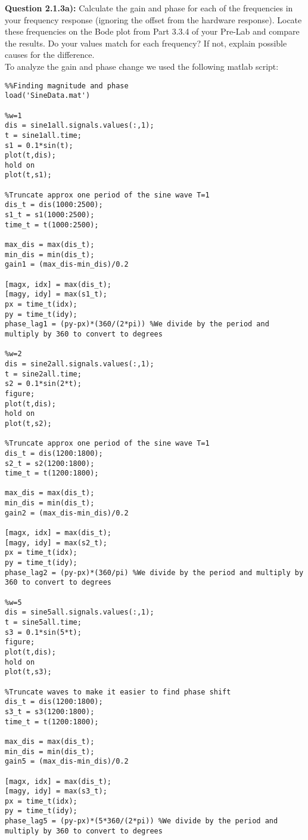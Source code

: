 \documentclass[11pt, twoside, letterpaper]{article}   	%
\begin{document}
\newpage
\textbf{Question 2.1.3a):} Calculate the gain and phase for each of the frequencies in your frequency response (ignoring the offset from the hardware response). Locate these frequencies on the Bode plot from Part 3.3.4 of your Pre-Lab and compare the results. Do your values match for each frequency? If not, explain possible causes for the difference.\\
To analyze the gain and phase change we used the following matlab script:
\begin{lstlisting}
%%Finding magnitude and phase
load('SineData.mat')

%w=1
dis = sine1all.signals.values(:,1);
t = sine1all.time;
s1 = 0.1*sin(t);
plot(t,dis);
hold on
plot(t,s1);

%Truncate approx one period of the sine wave T=1
dis_t = dis(1000:2500);
s1_t = s1(1000:2500);
time_t = t(1000:2500);

max_dis = max(dis_t);
min_dis = min(dis_t);
gain1 = (max_dis-min_dis)/0.2

[magx, idx] = max(dis_t);
[magy, idy] = max(s1_t);
px = time_t(idx);
py = time_t(idy);
phase_lag1 = (py-px)*(360/(2*pi)) %We divide by the period and multiply by 360 to convert to degrees

%w=2
dis = sine2all.signals.values(:,1);
t = sine2all.time;
s2 = 0.1*sin(2*t);
figure;
plot(t,dis);
hold on
plot(t,s2);

%Truncate approx one period of the sine wave T=1
dis_t = dis(1200:1800);
s2_t = s2(1200:1800);
time_t = t(1200:1800);

max_dis = max(dis_t);
min_dis = min(dis_t);
gain2 = (max_dis-min_dis)/0.2

[magx, idx] = max(dis_t);
[magy, idy] = max(s2_t);
px = time_t(idx);
py = time_t(idy);
phase_lag2 = (py-px)*(360/pi) %We divide by the period and multiply by 360 to convert to degrees

%w=5
dis = sine5all.signals.values(:,1);
t = sine5all.time;
s3 = 0.1*sin(5*t);
figure;
plot(t,dis);
hold on
plot(t,s3);

%Truncate waves to make it easier to find phase shift
dis_t = dis(1200:1800);
s3_t = s3(1200:1800);
time_t = t(1200:1800);

max_dis = max(dis_t);
min_dis = min(dis_t);
gain5 = (max_dis-min_dis)/0.2

[magx, idx] = max(dis_t);
[magy, idy] = max(s3_t);
px = time_t(idx);
py = time_t(idy);
phase_lag5 = (py-px)*(5*360/(2*pi)) %We divide by the period and multiply by 360 to convert to degrees
\end{lstlisting}
\end{document}
